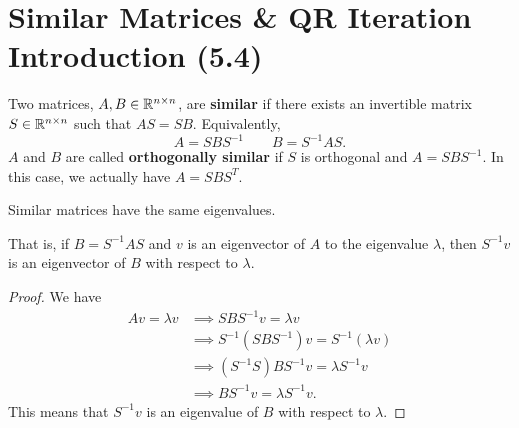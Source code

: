 \documentclass[letterpaper]{article}
\newcommand{\0}{\mathbf{0}}
\begin{document}
\section{Similar Matrices \& QR Iteration Introduction (5.4)}
Two matrices, $A, B \in \mathbb{R}^{n \times n}$, are \textbf{similar} if there exists an invertible matrix $S \in \mathbb{R}^{n \times n}$ such that $AS = SB$. Equivalently, \[A = SBS^{-1} \qquad B = S^{-1}AS.\]
$A$ and $B$ are called \textbf{orthogonally similar} if $S$ is orthogonal and $A = SBS^{-1}$. In this case, we actually have $A = SBS^T$. 

\begin{theorem}{}{}
    Similar matrices have the same eigenvalues. 
\end{theorem}
That is, if $B = S^{-1}AS$ and $v$ is an eigenvector of $A$ to the eigenvalue $\lambda$, then $S^{-1} v$ is an eigenvector of $B$ with respect to $\lambda$. 

\begin{proof}
    We have 
    \begin{equation}
        \begin{aligned}
            Av = \lambda v &\implies SBS^{-1}v = \lambda v \\ 
                &\implies S^{-1} (SBS^{-1})v = S^{-1}(\lambda v) \\ 
                &\implies (S^{-1} S)BS^{-1}v = \lambda S^{-1}v \\
                &\implies BS^{-1}v = \lambda S^{-1} v.
        \end{aligned}
    \end{equation}
    This means that $S^{-1}v$ is an eigenvalue of $B$ with respect to $\lambda$. 
\end{proof}
\end{document}
